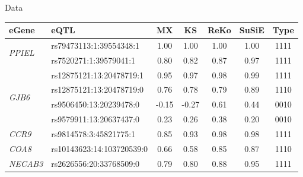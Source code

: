 \documentclass[]{beamer}
\def\tcb{\textcolor{black}}
\begin{document}
\begin{frame}{Data}
\begin{table}[h]
\begin{center}
{\small
\begin{tabular}{llccccc}
eGene &eQTL & MX & KS  & ReKo  & SuSiE & Type\\ 
\hline
\multirow{2}{*}{\emph{PPIEL}} 
&rs79473113:1:39554348:1 & 1.00 & 1.00 & 1.00 & 1.00 & 1111 \\
&rs7520271:1:39579041:1 & 0.80 & 0.82 & 0.87 & 0.97 & 1111 \\
\hline
\multirow{4}{*}{\emph{GJB6}}
&rs12875121:13:20478719:1 & 0.95 & 0.97 & 0.98 & 0.99 & 1111 \\
&rs12875121:13:20478719:0 & 0.76 & 0.78 & 0.79 & 0.89 & 1110 \\
&rs9506450:13:20239478:0 & -0.15 & -0.27 & 0.61 & 0.44 & 0010 \\
&rs9579911:13:20637437:0 & 0.23 & 0.26 & 0.38 & 0.20 &  0010 \\
\hline
\multirow{1}{*}{\emph{CCR9}}
&rs9814578:3:45821775:1 & 0.85 & 0.93 & 0.98 & 0.98 & 1111 \\
\hline
\multirow{1}{*}{\emph{COA8}}
&rs10143623:14:103720539:0 & 0.66 & 0.58 & 0.85 & 0.87 & 1110 \\ 
\hline
\multirow{1}{*}{\emph{NECAB3}}
&rs2626556:20:33768509:0&  0.79 & 0.80 & 0.88 & 0.95 & 1111\\
\hline
\end{tabular}
}
\end{center}
\end{table}%


\end{frame}
\end{document}
